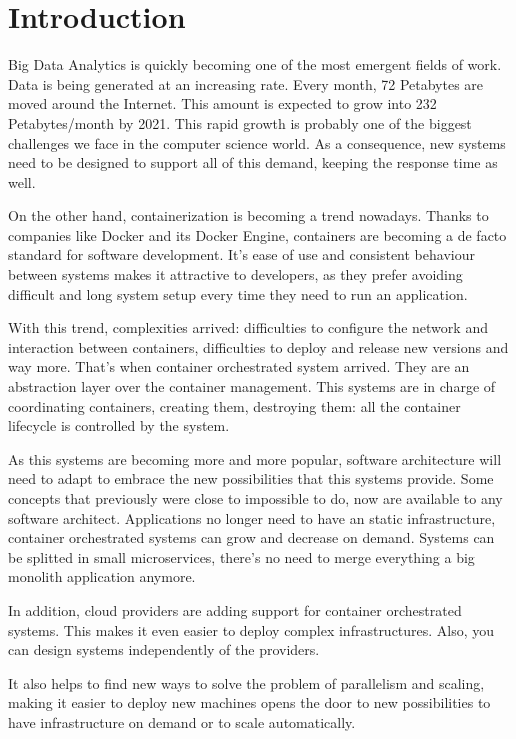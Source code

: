 
\chapter{Introduction} %

\label{Chapter1} %



Big Data Analytics is quickly becoming one of the most emergent fields of work. Data is being generated at an increasing rate. Every month, 72 Petabytes are moved around the Internet\parencite{ciscoreport}. This amount is expected to grow into 232 Petabytes/month by 2021\parencite{ciscoreport}. This rapid growth is probably one of the biggest challenges we face in the computer science world. As a consequence, new systems need to be designed to support all of this demand, keeping the response time as well. 

 
On the other hand, containerization is becoming a trend nowadays. Thanks to companies like Docker and its Docker Engine, containers are becoming a de facto standard for software development. It’s ease of use and consistent behaviour between systems makes it attractive to developers, as they prefer avoiding difficult and long system setup every time they need to run an application.
 
With this trend, complexities arrived: difficulties to configure the network and interaction between containers, difficulties to deploy and release new versions and way more. That’s when container orchestrated system arrived. They are an abstraction layer over the container management. This systems are in charge of coordinating containers, creating them, destroying them: all the container lifecycle is controlled by the system.
 
As this systems are becoming more and more popular, software architecture will need to adapt to embrace the new possibilities that this systems provide. Some concepts that previously were close to impossible to do, now are available to any software architect. Applications no longer need to have an static infrastructure, container orchestrated systems can grow and decrease on demand. Systems can be splitted in small microservices, there’s no need to merge everything a big monolith application anymore.
 
In addition, cloud providers are adding support for container orchestrated systems. This makes it even easier to deploy complex infrastructures. Also, you can design systems independently of the providers. 
 
It also helps to find new ways to solve the problem of parallelism and scaling, making it easier to deploy new machines opens the door to new possibilities to have infrastructure on demand or to scale automatically.
 
